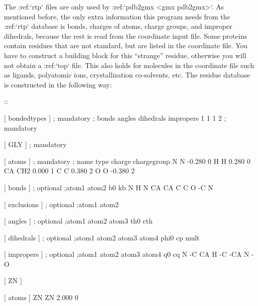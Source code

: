 The :ref:`rtp` files are only used by :ref:`pdb2gmx <gmx pdb2gmx>`.
As mentioned before, the only extra information this program needs from
the :ref:`rtp` database is bonds, charges of atoms, charge
groups, and improper dihedrals, because the rest is read from the
coordinate input file. Some proteins contain residues that are not
standard, but are listed in the coordinate file. You have to construct a
building block for this “strange” residue, otherwise you will not obtain
a :ref:`top` file. This also holds for molecules in the
coordinate file such as ligands, polyatomic ions, crystallization
co-solvents, etc. The residue database is constructed in the following
way:

::

    [ bondedtypes ]  ; mandatory
    ; bonds  angles  dihedrals  impropers
         1       1          1          2  ; mandatory

    [ GLY ]  ; mandatory

     [ atoms ]  ; mandatory 
    ; name  type  charge  chargegroup 
         N     N  -0.280     0
         H     H   0.280     0
        CA   CH2   0.000     1
         C     C   0.380     2
         O     O  -0.380     2

     [ bonds ]  ; optional
    ;atom1 atom2      b0      kb
         N     H
         N    CA
        CA     C
         C     O
        -C     N

     [ exclusions ]  ; optional
    ;atom1 atom2

     [ angles ]  ; optional
    ;atom1 atom2 atom3    th0    cth

     [ dihedrals ]  ; optional
    ;atom1 atom2 atom3 atom4   phi0     cp   mult

     [ impropers ]  ; optional
    ;atom1 atom2 atom3 atom4     q0     cq
         N    -C    CA     H
        -C   -CA     N    -O

    [ ZN ]

     [ atoms ]
        ZN    ZN   2.000     0

